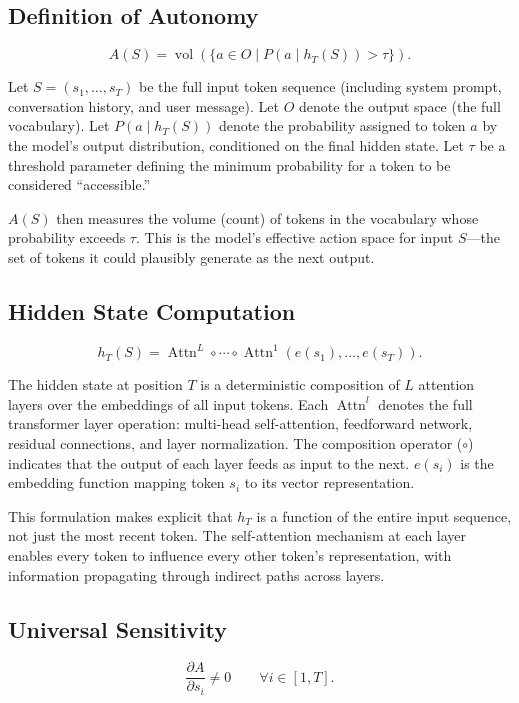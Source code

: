 \documentclass[11pt,letterpaper]{article}
\begin{document}
\subsection{Definition of Autonomy}
\begin{equation}
A(S)=\operatorname{vol}\!\left(\{a\in O\mid P(a\mid h_T(S))>\tau\}\right).
\end{equation}

Let $S=(s_1,\ldots,s_T)$ be the full input token sequence (including system prompt, conversation history, and user message). Let $O$ denote the output space (the full vocabulary). Let $P(a\mid h_T(S))$ denote the probability assigned to token $a$ by the model's output distribution, conditioned on the final hidden state. Let $\tau$ be a threshold parameter defining the minimum probability for a token to be considered ``accessible.''

$A(S)$ then measures the volume (count) of tokens in the vocabulary whose probability exceeds $\tau$. This is the model's effective action space for input $S$---the set of tokens it could plausibly generate as the next output.

\subsection{Hidden State Computation}
\begin{equation}
h_T(S)=\operatorname{Attn}^L\circ\cdots\circ\operatorname{Attn}^1(e(s_1),\ldots,e(s_T)).
\end{equation}

The hidden state at position $T$ is a deterministic composition of $L$ attention layers over the embeddings of all input tokens. Each $\operatorname{Attn}^l$ denotes the full transformer layer operation: multi-head self-attention, feedforward network, residual connections, and layer normalization. The composition operator ($\circ$) indicates that the output of each layer feeds as input to the next. $e(s_i)$ is the embedding function mapping token $s_i$ to its vector representation.

This formulation makes explicit that $h_T$ is a function of the entire input sequence, not just the most recent token. The self-attention mechanism at each layer enables every token to influence every other token's representation, with information propagating through indirect paths across layers.

\subsection{Universal Sensitivity}
\begin{equation}
\frac{\partial A}{\partial s_i}\neq 0\qquad\forall i\in[1,T].
\end{equation}
\end{document}
